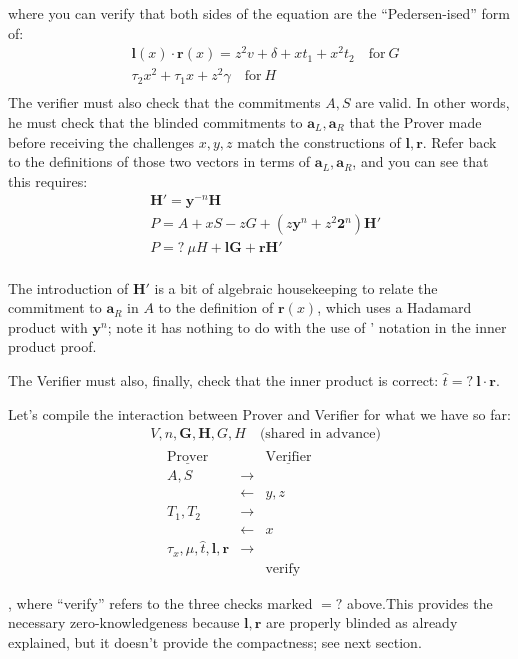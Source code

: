 \documentclass[10pt,a4paper]{article}
\begin{document}
where you can verify that both sides of the equation are the
``Pedersen-ised'' form of:
\begin{align*}
& \textbf{l}(x)\cdot\textbf{r}(x) = z^2 v + \delta + xt_1 + x^2t_2 \quad \textrm{for}\ G \\
& \tau_2x^2 + \tau_1x + z^2 \gamma \quad \textrm{for}\ H \\
\end{align*}
The verifier must also check that the commitments $A, S$ are valid. In other
words, he must check that the blinded commitments to $\textbf{a}_L, \textbf{a}_R$ that the Prover
made before receiving the challenges $x, y, z$ match the constructions of $\mathbf{l}, \mathbf{r}$.
Refer back to the definitions of those two vectors in terms of $\textbf{a}_L, \textbf{a}_R$, and you
can see that this requires:
\begin{align*}
& \textbf{H}' = \textbf{y}^{-n}\textbf{H} \\
& P = A + xS -zG + \left(z\textbf{y}^n + z^2\textbf{2}^n\right)\textbf{H}' \\
& P =? \ \mu H + \textbf{lG} + \textbf{rH}' \\
\end{align*}

The introduction of $\mathbf{H}'$ is a bit of algebraic housekeeping to relate the
commitment to $\mathbf{a}_R$ in $A$ to the definition of $\mathbf{r}(x)$, which uses a Hadamard product
with $\mathbf{y}^n$; note it has nothing to do with the use of ' notation in the inner
product proof.

The Verifier must also, finally, check that the inner product is
correct: $\hat{t} =? \ \textbf{l} \cdot \textbf{r}$.

Let's compile the interaction between Prover and Verifier for what we
have so far:
\begin{align*}
&V, n, \textbf{G}, \textbf{H}, G, H\quad \textrm{(shared in advance)}  \\
& \begin{matrix} 
& \underline{\textrm{Prover}} &  &\underline{\textrm{Verifier}}  &\\
 &  A, S & \rightarrow & &\\
 & & \leftarrow & y, z & \\
  & T_1, T_2 & \rightarrow & & \\
 & & \leftarrow & x & \\
 & \tau_x, \mu, \hat{t}, \textbf{l}, \textbf{r} & \rightarrow & & \\
 & & & \textrm{verify} & \\
\end{matrix} \\
\end{align*}
, where ``verify'' refers to the three checks marked $=?$ above.This provides
the necessary zero-knowledgeness because $\mathbf{l}, \mathbf{r}$ are properly blinded as already
explained, but it doesn't provide the compactness; see next section.
\end{document}
